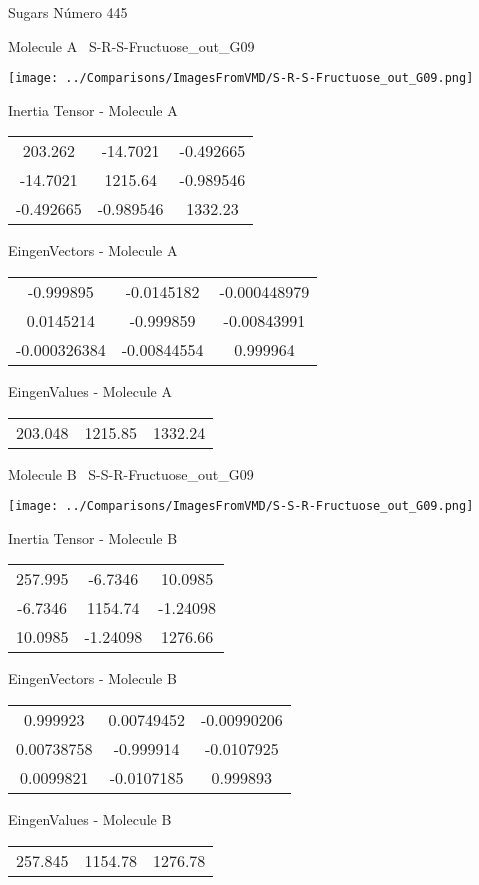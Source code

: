 \vtab[-3cm]
\begin{center}
{\large Sugars \tab Número 445}
\end{center}
\begin{multicols}{2}
\begin{center}

Molecule A \
S-R-S-Fructuose\_out\_G09

\texttt{[image: ../Comparisons/ImagesFromVMD/S-R-S-Fructuose\_out\_G09.png]}

Inertia Tensor - Molecule A \\
\begin{tabular}{|c c c|}
203.262	 & 	-14.7021	 & 	-0.492665	 \\
-14.7021	 & 	1215.64	 & 	-0.989546	 \\
-0.492665	 & 	-0.989546	 & 	1332.23
\end{tabular}

\vtab
 EingenVectors - Molecule A     \\
\begin{tabular}{|c c c|}
-0.999895	 & 	-0.0145182	 & 	-0.000448979	 \\
0.0145214	 & 	-0.999859	 & 	-0.00843991	 \\
-0.000326384	 & 	-0.00844554	 & 	0.999964
\end{tabular}

\vtab
 EingenValues - Molecule A     \\
\begin{tabular}{|c c c|}
203.048	 & 	1215.85	 & 	1332.24	 \\
\end{tabular}
\columnbreak

Molecule B \
S-S-R-Fructuose\_out\_G09

\texttt{[image: ../Comparisons/ImagesFromVMD/S-S-R-Fructuose\_out\_G09.png]}

Inertia Tensor - Molecule B \\
\begin{tabular}{|c c c|}
257.995	 & 	-6.7346	 & 	10.0985	 \\
-6.7346	 & 	1154.74	 & 	-1.24098	 \\
10.0985	 & 	-1.24098	 & 	1276.66
\end{tabular}

\vtab
 EingenVectors - Molecule B     \\
\begin{tabular}{|c c c|}
0.999923	 & 	0.00749452	 & 	-0.00990206	 \\
0.00738758	 & 	-0.999914	 & 	-0.0107925	 \\
0.0099821	 & 	-0.0107185	 & 	0.999893
\end{tabular}

\vtab
 EingenValues - Molecule B     \\
\begin{tabular}{|c c c|}
257.845	 & 	1154.78	 & 	1276.78	 \\
\end{tabular}

\end{center}
\end{multicols}

